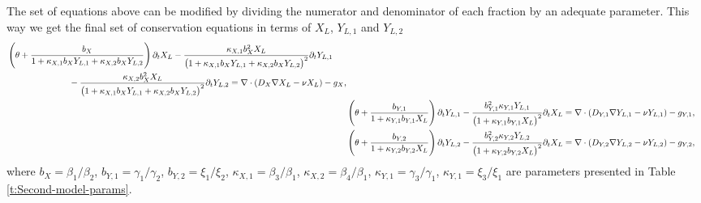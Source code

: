 \documentclass[11pt]{article}
\numberwithin{equation}{section}
\begin{document}
The set of equations above can be modified by dividing the numerator and denominator of each fraction by an adequate parameter. This way we get the final set of conservation equations in terms of $X_L$, $Y_{L,1}$ and $Y_{L,2}$
\begin{subequations}
\label{eq:extendedsys}
\begin{align}
	\begin{split} 
		&\left( \theta + \frac{b_X}{1 + \kappa_{X,1} b_{X} Y_{L,1} + \kappa_{X,2} b_{X} Y_{L,2}} \right)
		\partial_t X_L - 
		\frac{\kappa_{X,1} b_X^2 X_L}{\big(1 + \kappa_{X,1} b_{X} Y_{L,1} + \kappa_{X,2} b_{X} Y_{L,2} \big)^2} \partial_t Y_{L,1}
		\\
		&\hspace{2.5cm} -
		\frac{\kappa_{X,2} b_X^2 X_L}{\big(1 + \kappa_{X,1} b_{X} Y_{L,1} + \kappa_{X,2} b_{X} Y_{L,2} \big)^2} \partial_t Y_{L,2}
		= \nabla \cdot(D_X \nabla X_L - \nu X_L) - g_X, 
	\end{split} \label{eq:generalised-x_t}
	\\
	&\left(\theta + \frac{b_{Y,1}}{1 + \kappa_{Y,1} b_{Y,1} X_L}\right) \partial_t Y_{L,1}
	- 
	\frac{b_{Y,1}^2 \kappa_{Y,1} Y_{L,1}}{\big(1 + \kappa_{Y,1} b_{Y,1} X_L\big)^2} \partial_t X_L 
	= \nabla \cdot(D_{Y,1} \nabla Y_{L,1} - \nu Y_{L,1}) - g_{Y,1}, \label{eq:generalised-y_1_t}
	\\
	&\left(\theta + \frac{b_{Y,2}}{1 + \kappa_{Y,2} b_{Y,2} X_L}\right) \partial_t Y_{L,2} - \frac{ b_{Y,2}^2 \kappa_{Y,2} Y_{L,2}}{\big(1 + \kappa_{Y,2} b_{Y,2} X_L\big)^2} \partial_t X_L
	= \nabla \cdot(D_{Y,2} \nabla Y_{L,2} - \nu Y_{L,2}) - g_{Y,2}, \label{eq:generalised-y_2_t}
\end{align}
\end{subequations}
where $b_X = \beta_1 / \beta_2$, $b_{Y,1} = \gamma_1 / \gamma_2$, $b_{Y,2} = \xi_1 / \xi_2$, $\kappa_{X,1} = \beta_3 / \beta_1$, $\kappa_{X,2} = \beta_4 / \beta_1$, $\kappa_{Y,1} = \gamma_3 / \gamma_1$, $\kappa_{Y,1} = \xi_3 / \xi_1$ are parameters presented in Table \ref{t:Second-model-params}.
	
	
\end{document}
